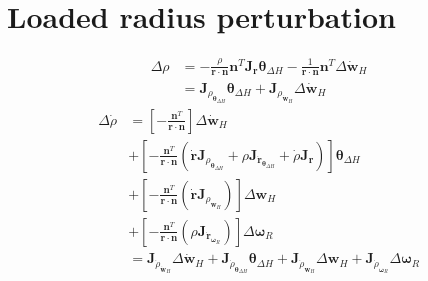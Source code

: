 \section{Loaded radius perturbation}
\begin{equation}
    \begin{split}
        \Delta \rho &= -\frac{\rho}{\mathbf{r} \cdot \mathbf{n}} \mathbf{n}^T \mathbf{J}_{\mathbf{r}} \boldsymbol{\theta}_{\Delta H} - \frac{1}{\mathbf{r} \cdot \mathbf{n}} \mathbf{n}^T \Delta \dot{\mathbf{w}}_H \\
        &= \mathbf{J}_{\rho_{\boldsymbol{\theta}_{\Delta H}}} \boldsymbol{\theta}_{\Delta H} + \mathbf{J}_{\rho_{\dot{\mathbf{w}}_H}}\Delta \dot{\mathbf{w}}_H
    \end{split}
\end{equation}
\begin{equation}
    \begin{split}
        \Delta \dot{\rho} &= \left[-\frac{\mathbf{n}^T}{\mathbf{r} \cdot \mathbf{n}}\right] \Delta \dot{\mathbf{w}}_H \\
        &+ \left[-\frac{\mathbf{n}^T}{\mathbf{r} \cdot \mathbf{n}}\left(\dot{\mathbf{r}}\mathbf{J}_{\rho_{\boldsymbol{\theta}_{\Delta H}}} + \rho \mathbf{J}_{\dot{\mathbf{r}}_{\boldsymbol{\theta}_{\Delta H}}} + \dot{\rho}\mathbf{J}_{\mathbf{r}}\right)\right] \boldsymbol{\theta}_{\Delta H}\\
        &+ \left[-\frac{\mathbf{n}^T}{\mathbf{r} \cdot \mathbf{n}}\left(\dot{\mathbf{r}}\mathbf{J}_{\rho_{\mathbf{w}_H}}\right)\right] \Delta \mathbf{w}_H\\
        &+ \left[-\frac{\mathbf{n}^T}{\mathbf{r} \cdot \mathbf{n}}\left(\rho\mathbf{J}_{\dot{\mathbf{r}}_{\boldsymbol{\omega}_R}}\right)\right] \Delta \boldsymbol{\omega}_R \\
        &= \mathbf{J}_{\dot{\rho}_{\dot{\mathbf{w}}_H}}\Delta \dot{\mathbf{w}}_H + \mathbf{J}_{\dot{\rho}_{\boldsymbol{\theta}_{\Delta H}}} \boldsymbol{\theta}_{\Delta H} + \mathbf{J}_{\dot{\rho}_{\mathbf{w}_H}}\Delta \mathbf{w}_H + \mathbf{J}_{\dot{\rho}_{\boldsymbol{\omega}_R}} \Delta \boldsymbol{\omega}_R
    \end{split}
\end{equation}
